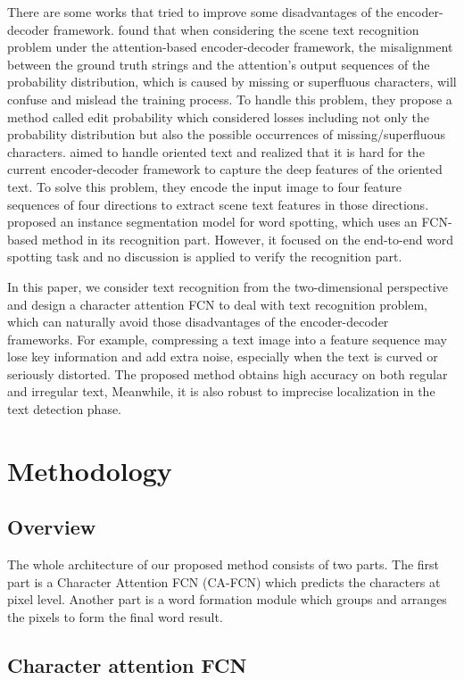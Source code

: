 \documentclass[letterpaper]{article} \usepackage{aaai19}  \usepackage{times}  \usepackage{helvet}  \usepackage{courier}  \usepackage{url}  \usepackage{graphicx}  \frenchspacing  \usepackage{multirow}
\begin{document}
There are some works that tried to improve some disadvantages of the encoder-decoder framework. \cite{bai2018edit} found that when considering the scene text recognition problem under the attention-based encoder-decoder framework, the misalignment between the ground truth strings and the attention's output sequences of the probability distribution, which is caused by missing or superfluous characters, will confuse and mislead the training process. To handle this problem, they propose a method called edit probability which considered losses including not only the probability distribution but also the possible occurrences of missing/superfluous characters. \cite{cheng2018aon} aimed to handle oriented text and realized that it is hard for the current encoder-decoder framework to capture the deep features of the oriented text. To solve this problem, they encode the input image to four feature sequences of four directions to extract scene text features in those directions. \cite{masktextspotter} proposed an instance segmentation model for word spotting, which uses an FCN-based method in its recognition part. However, it focused on the end-to-end word spotting task and no discussion is applied to verify the recognition part.

In this paper, we consider text recognition from the two-dimensional perspective and design a character attention FCN to deal with text recognition problem, which can naturally avoid those disadvantages of the encoder-decoder frameworks. 
For example, compressing a text image into a feature sequence may lose key information and add extra noise, especially when the text is curved or seriously distorted.
The proposed method obtains high accuracy on both regular and irregular text, Meanwhile, it is also robust to imprecise localization in the text detection phase.

\section{Methodology}
\subsection{Overview}
The whole architecture of our proposed method consists of two parts. The first part is a Character Attention FCN (CA-FCN) which predicts the characters at pixel level. Another part is a word formation module which groups and arranges the pixels to form the final word result.
\subsection{Character attention FCN}
\end{document}
